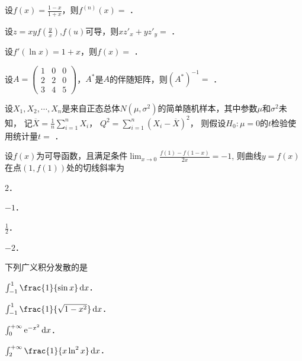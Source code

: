 \documentclass[plain,noanswer,medmath]{../../template/jnuexam}
\begin{document}




\begin{problem}
设$f(x) = \frac{1 - x}{1 + x}$，则$f^{(n)}(x) =$ \fillin{}．
\end{problem}


\begin{problem}
设$z = xyf\left(\frac{y}{x} \right)$,$f(u)$可导，则$xz'_x + yz'_y =$ \fillin{}．
\end{problem}


\begin{problem}
设$f'(\ln x) = 1 + x$，则$f(x) =$ \fillin{}．
\end{problem}


\begin{problem}
设$A = \begin{pmatrix}
  1 & 0 & 0 \\
  2 & 2 & 0 \\
  3 & 4 & 5
\end{pmatrix}$，$A^*$是$A$的伴随矩阵，则$(A^*)^{-1} =$ \fillin{}．
\end{problem}


\begin{problem}
设$X_1,X_2, \cdots ,X_n$是来自正态总体$N(\mu ,\sigma^2)$的简单随机样本，其中参数$\mu$和$\sigma^2$未知，
记$\overline{X}= \frac{1}{n}\sum_{i = 1}^n X_i^{}$，
$Q^2 = \sum_{i = 1}^n (X_i^{} - \overline{X})^2$，
则假设$H_0:\mu = 0$的$t$检验使用统计量$t =$ \fillin{}．
\end{problem}




\begin{problem}
设$f(x)$为可导函数，且满足条件$\lim_{x \to 0} \frac{f(1) - f(1 - x)}{2x} = - 1$,
则曲线$y = f(x)$在点$(1,f(1))$处的切线斜率为\pickout{}
\begin{abcd}
\item $2$．         
\item $- 1$．         
\item $\frac{1}{2}$．         
\item $- 2$．
\end{abcd}
\end{problem}


\begin{problem}
下列广义积分发散的是\pickout{}
\begin{abcd}
\item $\int_{-1}^1\frac{1}{\sin x}\dx$．
\item $\int_{-1}^1\frac{1}{\sqrt{1 - x^2}}\dx$．
\item $\int_0^{+\infty} \mathrm{e}^{- x^2} \mathop{}\!\mathrm{d} x$．
\item $\int_2^{+\infty} \frac{1}{x\ln^2 x} \dx$．
\end{abcd}
\end{problem}
\end{document}
